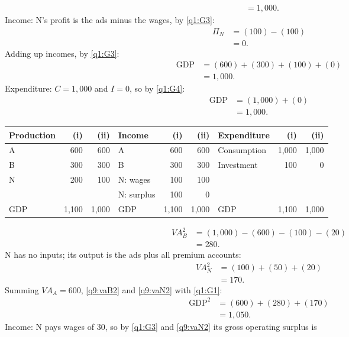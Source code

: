 \begin{sol}
\begin{align}
&= 1{,}000. \label{q9:Y1e}
\end{align}
Income: N's profit is the ads minus the wages, by \eqref{q1:G3}:
\begin{align*}
\Pi_N &= (100)-(100)\\
&= 0 .
\end{align*}
Adding up incomes, by \eqref{q1:G3}:
\begin{align*}
\text{GDP} &= (600)+(300)+(100)+(0)\\
&= 1{,}000 .
\end{align*}
Expenditure: $C=1{,}000$ and $I=0$, so by \eqref{q1:G4}:
\begin{align*}
\text{GDP} &= (1{,}000)+(0)\\
&= 1{,}000 .
\end{align*}
\begin{center}\footnotesize\begin{tabular}{@{}lrr@{\qquad}lrr@{\qquad}lrr@{}}\toprule
Production & (i) & (ii) & Income & (i) & (ii) & Expenditure & (i) & (ii)\\\midrule
A & 600 & 600 & A & 600 & 600 & Consumption & 1{,}000 & 1{,}000\\
B & 300 & 300 & B & 300 & 300 & Investment & 100 & 0\\
N & 200 & 100 & N: wages & 100 & 100 & & & \\
 & & & N: surplus & 100 & 0 & & & \\\midrule
GDP & 1{,}100 & 1{,}000 & GDP & 1{,}100 & 1{,}000 & GDP & 1{,}100 & 1{,}000\\\bottomrule\end{tabular}\end{center}
\begin{align}
VA^2_B &= (1{,}000)-(600)-(100)-(20) \nonumber\\
&= 280. \label{q9:vaB2}
\end{align}
N has no inputs; its output is the ads plus all premium accounts:
\begin{align}
VA^2_N &= (100)+(50)+(20) \nonumber\\
&= 170. \label{q9:vaN2}
\end{align}
Summing $VA_A=600$, \eqref{q9:vaB2} and \eqref{q9:vaN2} with \eqref{q1:G1}:
\begin{align}
\text{GDP}^2 &= (600)+(280)+(170) \nonumber\\
&= 1{,}050. \label{q9:Y2}
\end{align}
Income: N pays wages of 30, so by \eqref{q1:G3} and \eqref{q9:vaN2} its gross operating surplus is

\end{sol}
